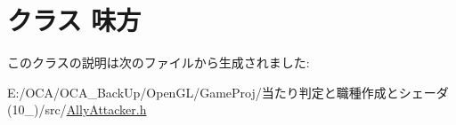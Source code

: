 \hypertarget{class_xE5_x91_xB3_xE6_x96_xB9}{\section{クラス 味方}
\label{class_xE5_x91_xB3_xE6_x96_xB9}
}


このクラスの説明は次のファイルから生成されました\-:\begin{DoxyCompactItemize}
\item 
E\-:/\-O\-C\-A/\-O\-C\-A\-\_\-\-Back\-Up/\-Open\-G\-L/\-Game\-Proj/当たり判定と職種作成とシェーダ(10\-\_)/src/\hyperlink{_ally_attacker_8h}{Ally\-Attacker.\-h}\end{DoxyCompactItemize}
